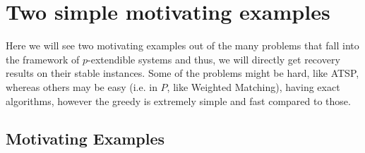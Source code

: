 \section{Two simple motivating examples}\label{app-A}
Here we will see two motivating examples out of the many problems \cite{mestre2006greedy} that fall into the framework of $p$-extendible systems and thus, we will directly get recovery results on their stable instances. Some of the problems might be hard, like ATSP, whereas others may be easy (i.e. in $P$, like Weighted Matching), having exact algorithms, however the greedy is extremely simple and fast compared to those. 


\subsection{Motivating Examples}

